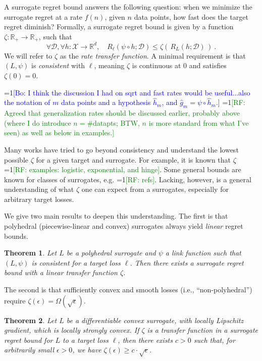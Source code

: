 \documentclass{article}
\newtheorem{theorem}{Theorem}
\newcommand{\Comments}{1}
\newcommand{\mynote}[2]{\ifnum\Comments=1\textcolor{#1}{#2}\fi}
\newcommand{\raf}[1]{\mynote{green}{[RF: #1]}}
\newcommand{\bo}[1]{\mynote{blue}{[Bo: #1]}}
\newcommand{\reals}{\mathbb{R}}
\newcommand{\D}{\mathcal{D}}
\newcommand{\X}{\mathcal{X}}
\begin{document}
A surrogate regret bound answers the following question: when we minimize the surrogate regret at a rate $f(n)$, given $n$ data points, how fast does the target regret diminish?
Formally, a surrogate regret bound is given by a function $\zeta : \reals_+ \to \reals_+$, such that
\begin{equation}
  \label{eq:surrogate-regret-bound}
  \forall \D, \forall h:\X\to\reals^d, \quad R_\ell(\psi\circ h;\D) \leq \zeta(\, R_L(h;\D) \,)~.
\end{equation}
We will refer to $\zeta$ as the \emph{rate transfer function}.
A minimal requirement is that $(L,\psi)$ is \emph{consistent} with $\ell$, meaning $\zeta$ is continuous at $0$ and satisfies $\zeta(0) = 0$.

\bo{I think the discussion I had on sqrt and fast rates would be useful...also the notation of $m$ data points and a hypothesis $\hat{h}_m$, and $\hat{g}_m = \psi \circ \hat{h}_m$.}
\raf{Agreed that generalization rates should be discussed earlier, probably above (where I do introduce $n=$\#datapts; BTW, $n$ is more standard from what I've seen) as well as below in examples.}

Many works have tried to go beyond consistency and understand the lowest possible $\zeta$ for a given target and surrogate.
For example, it is known that $\zeta$ \raf{examples: logistic, exponential, and hinge}.
Some general bounds are known for classes of surrogates, e.g. \raf{refs}.
Lacking, however, is a general understanding of what $\zeta$ one can expect from a surrogates, especially for arbitrary target losses.

We give two main results to deepen this understanding.
The first is that polyhedral (piecewise-linear and convex) surrogates always yield \emph{linear} regret bounds.
\begin{theorem}
  Let $L$ be a polyhedral surrogate and $\psi$ a link function such that $(L,\psi)$ is consistent for a target loss $\ell$.
  Then there exists a surrogate regret bound with a linear transfer function $\zeta$.
\end{theorem}
The second is that sufficiently convex and smooth losses (i.e., ``non-polyhedral'') require $\zeta(\epsilon) = \Omega(\sqrt{\epsilon})$.

\begin{theorem}
  Let $L$ be a differentiable convex surrogate, with locally Lipschitz gradient, which is locally strongly convex.
  If $\zeta$ is a transfer function in a surrogate regret bound for $L$ to a target loss $\ell$, then there exists $c>0$ such that, for arbitrarily small $\epsilon>0$, we have $\zeta(\epsilon) \geq c\cdot\sqrt{\epsilon}$.
\end{theorem}
\end{document}
